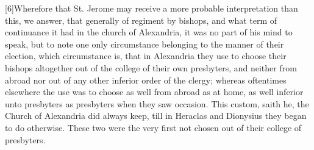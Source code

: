 [6]Wherefore that St. Jerome may receive a more probable interpretation than this, we answer, that generally of regiment by bishops, and what term of continuance it had in the church of Alexandria, it was no part of his mind to speak, but to note one only circumstance belonging to the manner of their election, which circumstance is, that in Alexandria they use to choose their bishops altogether out of the college of their own presbyters, and neither from abroad nor out of any other inferior order of the clergy; whereas oftentimes elsewhere the use was to choose as well from abroad as at home, as well inferior unto presbyters as presbyters when they saw occasion. This custom,  saith he, the Church of Alexandria did always keep, till in Heraclas and Dionysius they began to do otherwise. These two were the very first not chosen out of their college of presbyters.

